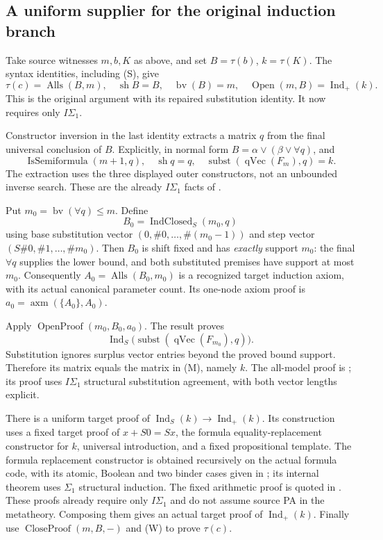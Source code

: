 \subsection{A uniform supplier for the original induction branch}

Take source witnesses $m,b,K$ as above, and set $B=\tau(b)$,
$k=\tau(K)$.  The syntax identities, including (S), give
\[
 \tau(c)=\operatorname{Alls}(B,m),\quad
 \operatorname{sh}B=B,\quad\operatorname{bv}(B)=m,\quad
 \operatorname{Open}(m,B)=\operatorname{Ind}_{+}(k).        \tag{W}
\]
This is the original  argument
with its repaired substitution identity.  It now requires only $I\Sigma_1$.

Constructor inversion in the last identity extracts a matrix $q$ from
the final universal conclusion of $B$.  Explicitly, in normal form
$B=\alpha\vee(\beta\vee\forall q)$, and
\[
 \operatorname{IsSemiformula}(m+1,q),\quad
 \operatorname{sh}q=q,\quad
 \operatorname{subst}(\operatorname{qVec}(F_m),q)=k .       \tag{M}
\]
The extraction uses the three displayed outer constructors, not an
unbounded inverse search.  These are the already $I\Sigma_1$ facts of
.

Put $m_0=\operatorname{bv}(\forall q)\le m$.  Define
\[
 B_0=\operatorname{IndClosed}_{S}(m_0,q)
\]
using base substitution vector $(0,\#0,\ldots,\#(m_0-1))$ and step
vector $(S\#0,\#1,\ldots,\#m_0)$.  Then $B_0$ is shift fixed and
has \emph{exactly} support $m_0$: the final $\forall q$ supplies the
lower bound, and both substituted premises have support at most $m_0$.
Consequently
$A_0=\operatorname{Alls}(B_0,m_0)$ is a recognized target induction
axiom, with its actual canonical parameter count.  Its one-node axiom
proof is $a_0=\operatorname{axm}(\{A_0\},A_0)$.

Apply $\operatorname{OpenProof}(m_0,B_0,a_0)$.  The result proves
\[
 \operatorname{Ind}_{S}\bigl(
       \operatorname{subst}(\operatorname{qVec}(F_{m_0}),q)\bigr).
\]
Substitution ignores surplus vector entries beyond the proved bound
support.  Therefore its matrix equals the matrix in (M), namely $k$.
The all-model proof is
; its proof uses $I\Sigma_1$
structural substitution agreement, with both vector lengths explicit.

There is a uniform target proof of
$\operatorname{Ind}_{S}(k)\to\operatorname{Ind}_{+}(k)$.
Its construction uses a fixed target proof of $x+S0=Sx$, the formula
equality-replacement constructor for $k$, universal introduction, and a
fixed propositional template.  The formula replacement constructor is
obtained recursively on the actual formula code, with its atomic,
Boolean and two binder cases given in
; its internal
 theorem uses $\Sigma_1$ structural induction.
The fixed arithmetic proof is quoted in
.  These proofs already
require only $I\Sigma_1$ and do not assume source PA in the metatheory.
Composing them gives an actual target proof of $\operatorname{Ind}_{+}(k)$.
Finally use $\operatorname{CloseProof}(m,B,-)$ and (W) to prove $\tau(c)$.

